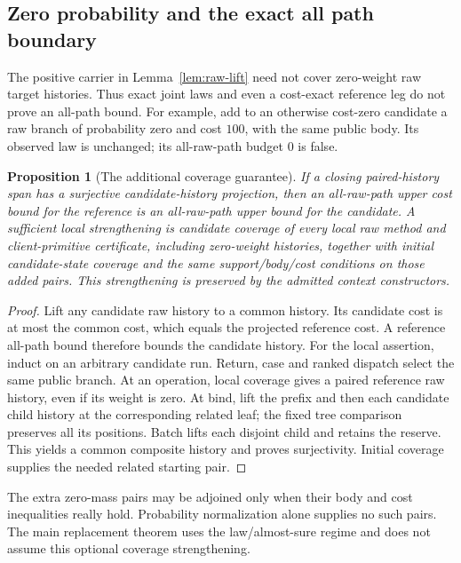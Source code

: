 \documentclass[11pt,a4paper]{article}
\newtheorem{proposition}[theorem]{Proposition}
\theoremstyle{definition}
\begin{document}
\subsection{Zero probability and the exact all path boundary}
\label{sec:zeros}
The positive carrier in Lemma~\ref{lem:raw-lift} need not cover
zero-weight raw target histories. Thus exact joint laws and even a
cost-exact reference leg do not prove an all-path bound. For example,
add to an otherwise cost-zero candidate a raw branch of probability
zero and cost $100$, with the same public body. Its observed law is
unchanged; its all-raw-path budget $0$ is false.

\begin{proposition}[The additional coverage guarantee]\label{prop:coverage}
If a closing paired-history span has a surjective candidate-history
projection, then an all-raw-path upper cost bound for the reference is
an all-raw-path upper bound for the candidate. A sufficient local
strengthening is candidate coverage of every local raw method and
client-primitive certificate, including zero-weight histories, together
with initial candidate-state coverage and the same support/body/cost
conditions on those added pairs. This strengthening is preserved by the
admitted context constructors.
\end{proposition}
\begin{proof}
Lift any candidate raw history to a common history. Its candidate cost
is at most the common cost, which equals the projected reference cost.
A reference all-path bound therefore bounds the candidate history.
For the local assertion, induct on an arbitrary candidate run. Return,
case and ranked dispatch select the same public branch. At an operation,
local coverage gives a paired reference raw history, even if its weight
is zero. At bind, lift the prefix and then each candidate child history
at the corresponding related leaf; the fixed tree comparison preserves
all its positions. Batch lifts each disjoint child and retains the
reserve. This yields a common composite history and proves surjectivity.
Initial coverage supplies the needed related starting pair.
\end{proof}
The extra zero-mass pairs may be adjoined only when their body and cost
inequalities really hold. Probability normalization alone supplies no
such pairs. The main replacement theorem uses the law/almost-sure regime
and does not assume this optional coverage strengthening.
\end{document}
